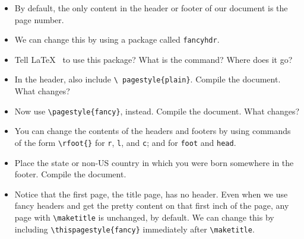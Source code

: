 \begin{itemize}
\item By default, the only content in the header or footer of our
  document is the page number.
\item We can change this by using a package called \texttt{fancyhdr}.
\item Tell \LaTeX~ to use this package? What is the command? Where
  does it go?
\item In the header, also include \texttt{\textbackslash
    pagestyle\{plain\}}. Compile the document. What changes?
\item Now use \texttt{\textbackslash pagestyle\{fancy\}},
  instead. Compile the document. What changes?
\item You can change the contents of the headers and footers by using
  commands of the form \texttt{\textbackslash rfoot\{\}} for
  \texttt{r}, \texttt{l}, and \texttt{c}; and for \texttt{foot} and
  \texttt{head}.
\item Place the state or non-US country in which you were born
  somewhere in the footer. Compile the document.
\item Notice that the first page, the title page, has no header. Even
  when we use fancy headers and get the pretty content on that first
  inch of the page, any page with \texttt{\textbackslash maketitle} is
  unchanged, by default. We can change this by including
  \texttt{\textbackslash thispagestyle\{fancy\}} immediately after
  \texttt{\textbackslash maketitle}.
\end{itemize}




